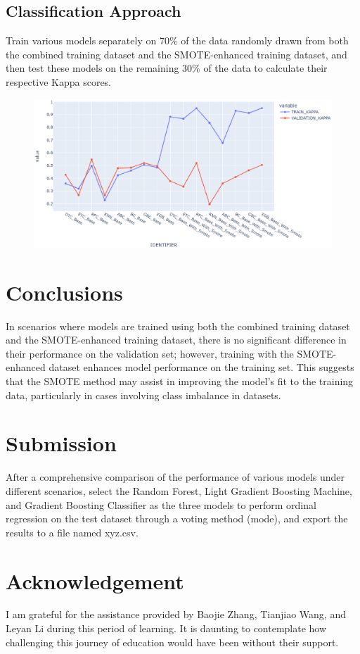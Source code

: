 \subsection{Classification Approach}\phantom{...}

Train various models separately on 70\% of the data randomly drawn from both the combined training dataset and the SMOTE-enhanced training dataset, and then test these models on the remaining 30\% of the data to calculate their respective Kappa scores.

\begin{figure}[H]
	\centering
	\includegraphics[width=1\linewidth]{tex/kappa}
	\caption{}
	\label{fig:kappa}
\end{figure}


\section{Conclusions} 

In scenarios where models are trained using both the combined training dataset and the SMOTE-enhanced training dataset, there is no significant difference in their performance on the validation set; however, training with the SMOTE-enhanced dataset enhances model performance on the training set. This suggests that the SMOTE method may assist in improving the model's fit to the training data, particularly in cases involving class imbalance in datasets.

\section{Submission}

After a comprehensive comparison of the performance of various models under different scenarios, select the Random Forest, Light Gradient Boosting Machine, and Gradient Boosting Classifier as the three models to perform ordinal regression on the test dataset through a voting method (mode), and export the results to a file named xyz.csv.

\section*{Acknowledgement}
I am grateful for the assistance provided by Baojie Zhang, Tianjiao Wang, and Leyan Li during this period of learning. It is daunting to contemplate how challenging this journey of education would have been without their support.


